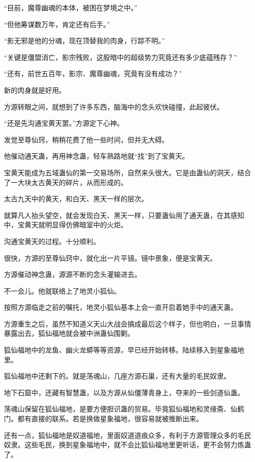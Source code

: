 \begin{this_body}
“目前，魔尊幽魂的本体，被困在梦境之中。”

“但他筹谋数万年，肯定还有后手。”

“影无邪是他的分魂，现在顶替我的肉身，行踪不明。”

“关键是僵盟消亡，影宗残败，这股暗中的超级势力究竟还有多少底蕴残存？”

“还有，前世五百年，影宗、魔尊幽魂，究竟有没有成功？”

新的肉身就是好用。

方源转眼之间，就想到了许多东西，脑海中的念头欢快碰撞，此起彼伏。

“还是先沟通宝黄天罢。”方源定下心神。

发觉至尊仙窍，稍稍花费了他一些时间，但并无大碍。

他催动通天蛊，再用神念蛊，轻车熟路地就“找”到了宝黄天。

宝黄天能成为五域蛊仙的第一交易场所，自然来头很大。它是由蛊仙的洞天，结合了一大块太古黄天的碎片，从而形成的。

太古九天中的黄天，和白天、黑天一样的层次。

就算凡人抬头望空，就会发现白天、黑天一样，只要蛊仙用了通天蛊，在其感知中，宝黄天就明显得仿佛暗室中的火炬。

沟通宝黄天的过程。十分顺利。

很快，方源的至尊仙窍中，就化出一片平镜。镜中景象，便是宝黄天。

方源催动神念蛊，源源不断的念头灌输进去。

不一会儿。他就联络上了地灵小狐仙。

按照方源临走之前的嘱托，地灵小狐仙基本上会一直开启着她手中的通天蛊。

方源重生之后，虽然不知道义天山大战会搞成最后这个样子，但也明白，一旦事情暴露出去，狐仙福地就会被中洲蛊仙围剿。

狐仙福地中的龙鱼、幽火龙蟒等等资源，早已经开始转移。陆续移入到星象福地里。

狐仙福地中还剩下的。就是荡魂山，几座方源石巢，还有大量的毛民奴隶。

地下石窟中，还藏有智慧蛊，以及方源从仙僵薄青身上，夺来的一些剑道仙蛊。

荡魂山保留在狐仙福地，是要方便胆识蛊的贸易。毕竟狐仙福地和灵缘斋、仙鹤门。都有直接的联系。若是换做星象福地，很容易就被推断出来。

还有一点，狐仙福地是奴道福地，里面奴道道痕众多，有利于方源管理众多的毛民奴隶。这些毛民，换到星象福地中，就不会比狐仙福地里更听话，更不会努力炼蛊了。


\end{this_body}
